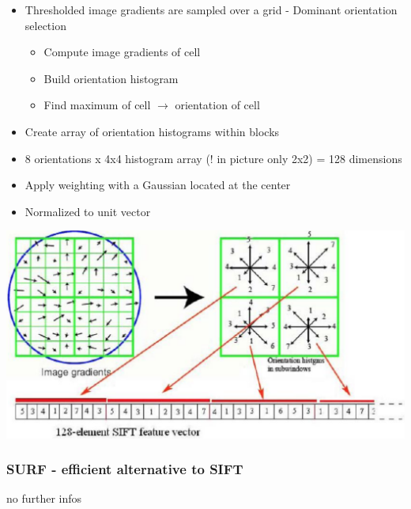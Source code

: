 \begin{itemize}
	\item Thresholded image gradients are sampled over a grid - Dominant orientation selection
	\begin{itemize}
		\item Compute image gradients of cell
		\item Build orientation histogram
		\item Find maximum of cell $\rightarrow$ orientation of cell
	\end{itemize}
	\item Create array of orientation histograms within blocks
	\item 8 orientations x 4x4 histogram array (! in picture only 2x2) = 128 dimensions
	\item Apply weighting with a Gaussian located at the center
	\item Normalized to unit vector
\end{itemize}

\includegraphics[width=\columnwidth]{pictures/sift}

\subsubsection{SURF - efficient alternative to SIFT}
no further infos